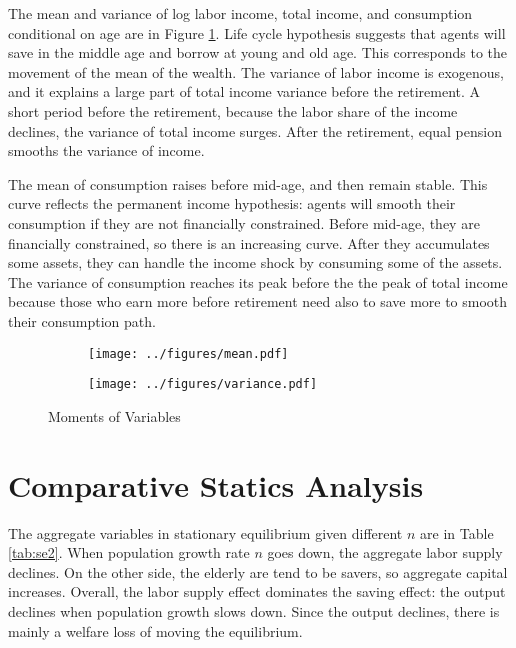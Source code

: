 \documentclass{article}
\begin{document}
	The mean and variance of log labor income, total income, and consumption conditional on age are in Figure \ref{fig:mom}.
	Life cycle hypothesis suggests that agents will save in the middle age and borrow at young and old age.
	This corresponds to the movement of the mean of the wealth.
	The variance of labor income is exogenous, and it explains a large part of total income variance before the retirement.
	A short period before the retirement, because the labor share of the income declines, the variance of total income surges.
	After the retirement, equal pension smooths the variance of income.
	
	The mean of consumption raises before mid-age, and then remain stable.
	This curve reflects the permanent income hypothesis: agents will smooth their consumption if they are not financially constrained.
	Before mid-age, they are financially constrained, so there is an increasing curve.
	After they accumulates some assets, they can handle the income shock by consuming some of the assets.
	The variance of consumption reaches its peak before the the peak of total income because those who earn more before retirement need also to save more to smooth their consumption path.
	\begin{figure}[h]
		\centering
		\begin{subfigure}{0.48\textwidth}
			\texttt{[image: ../figures/mean.pdf]}
		\end{subfigure}
		\begin{subfigure}{0.48\textwidth}
			\texttt{[image: ../figures/variance.pdf]}
		\end{subfigure}
		\caption{Moments of Variables}
		\label{fig:mom}
	\end{figure}
	\section{Comparative Statics Analysis}
	
	The aggregate variables in stationary equilibrium given different $n$ are in Table \ref{tab:se2}.
	When population growth rate $n$ goes down, the aggregate labor supply declines.
	On the other side, the elderly are tend to be savers, so aggregate capital increases.
	Overall, the labor supply effect dominates the saving effect: the output declines when population growth slows down.
	Since the output declines, there is mainly a welfare loss of moving the equilibrium.
	
\end{document}
